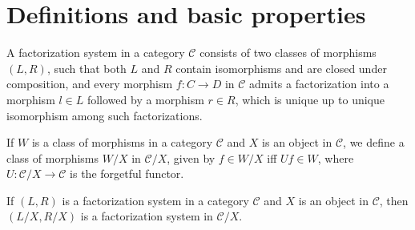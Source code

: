 %

\section{Definitions and basic properties}

\begin{definition}
  \leanok
  A factorization system in a category $\mathcal{C}$ consists of two classes of morphisms $(L,R)$, such that both $L$ and $R$ contain isomorphisms and are closed under composition, and every morphism $f: C \to D$ in $\mathcal{C}$ admits a factorization into a morphism $l\in L$ followed by a morphism $r\in R$, which is unique up to unique isomorphism among such factorizations.
  \begin{center}
\end{center}
\end{definition}

\begin{definition}
  \leanok
  If $W$ is a class of morphisms in a category $\mathcal{C}$ and $X$ is an object in $\mathcal{C}$, we define a class of morphisms $W/X$ in $\mathcal{C}/X$, given by $f \in W/X$ iff $U f \in W$, where $U : \mathcal{C}/X \to \mathcal{C}$ is the forgetful functor.
\end{definition}

\begin{lemma}
  \leanok
  If $(L,R)$ is a factorization system in a category $\mathcal{C}$ and $X$ is an object in $\mathcal{C}$, then $(L/X,R/X)$ is a factorization system in $\mathcal{C}/X$.
\end{lemma}

